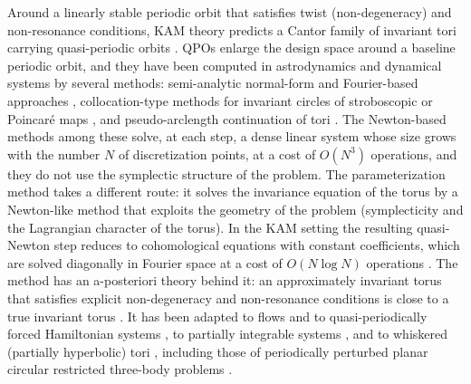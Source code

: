 \documentclass[11pt]{article}
\begin{document}
Around a linearly stable periodic orbit that satisfies twist (non-degeneracy) and non-resonance
conditions, KAM theory predicts a Cantor family of invariant tori carrying quasi-periodic orbits
\cite{kolmogorov1954,arnold1963proof,moser1962}. QPOs
enlarge the design space around a baseline periodic orbit, and they have been computed in
astrodynamics and dynamical systems by several methods: semi-analytic normal-form and
Fourier-based approaches \cite{jorba1999normal,gomezmondelo2001,jorba2001numerical},
collocation-type methods for invariant circles of stroboscopic or Poincar\'e maps
\cite{olikara2016computation,baresi2018qpo,mccarthy2021qpo}, and pseudo-arclength continuation of
tori \cite{schilder2005continuation}. The Newton-based methods among these solve, at each step, a
dense linear system whose size grows with the number $N$ of discretization points, at a cost of
$O(N^3)$ operations, and they do not use the symplectic structure of the problem. The
parameterization method
\cite{gonzalez2005kam,haro2006parameterization,haro2016book} takes a different route: it solves
the invariance equation of the torus by a Newton-like method that exploits the geometry of the
problem (symplecticity and the Lagrangian character of the torus). In the KAM setting the
resulting quasi-Newton step reduces to cohomological equations with constant coefficients, which
are solved diagonally in Fourier space at a cost of $O(N\log N)$ operations
\cite{haroluque2016ch4,figueras2017rigorous}. The method has an a-posteriori theory behind it: an
approximately invariant torus that satisfies explicit non-degeneracy and non-resonance conditions
is close to a true invariant torus \cite{gonzalez2005kam,figueras2017rigorous}. It has been
adapted to flows and to quasi-periodically forced Hamiltonian systems
\cite{haromondelo2021flow,fernandezmora2024siads}, to partially integrable systems
\cite{haroluque2019partially}, and to whiskered (partially hyperbolic) tori
\cite{fernandezmora2026convergence}, including those of periodically perturbed planar circular
restricted three-body problems \cite{kumar2022whiskered}.
\end{document}
